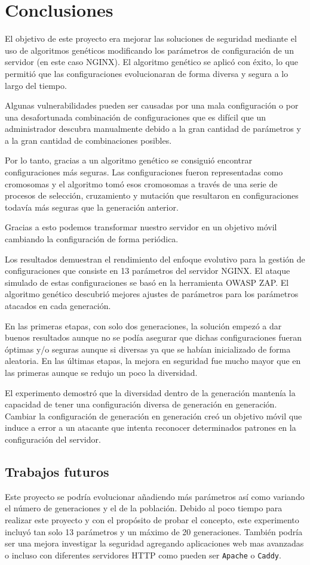 \chapter{Conclusiones}

El objetivo de este proyecto era mejorar las soluciones de seguridad mediante el uso de algoritmos genéticos modificando los parámetros de configuración de un servidor (en este caso NGINX). El algoritmo genético se aplicó con éxito, lo que permitió que las configuraciones evolucionaran de forma diversa y segura a lo largo del tiempo.

\bigskip
Algunas vulnerabilidades pueden ser causadas por una mala configuración o por una desafortunada combinación de configuraciones que es difícil que un administrador descubra manualmente debido a la gran cantidad de parámetros y a la gran cantidad de combinaciones posibles.

\bigskip
Por lo tanto, gracias a un algoritmo genético se consiguió encontrar configuraciones más seguras. Las configuraciones fueron representadas como cromosomas y el algoritmo tomó esos cromosomas a través de una serie de procesos de selección, cruzamiento y mutación que resultaron en configuraciones todavía más seguras que la generación anterior.

\bigskip
Gracias a esto podemos transformar nuestro servidor en un objetivo móvil cambiando la configuración de forma periódica.

\bigskip
Los resultados demuestran el rendimiento del enfoque evolutivo para la gestión de configuraciones que consiste en 13 parámetros del servidor NGINX. El ataque simulado de estas configuraciones se basó en la herramienta OWASP ZAP. El algoritmo genético descubrió mejores ajustes de parámetros para los parámetros atacados en cada generación.

\bigskip
En las primeras etapas, con solo dos generaciones, la solución empezó a dar buenos resultados aunque no se podía asegurar que dichas configuraciones fueran óptimas y/o seguras aunque si diversas ya que se habían inicializado de forma aleatoria. En las últimas etapas, la mejora en seguridad fue mucho mayor que en las primeras aunque se redujo un poco la diversidad.

\bigskip
El experimento demostró que la diversidad dentro de la generación mantenía la capacidad de tener una configuración diversa de generación en generación. Cambiar la configuración de generación en generación creó un objetivo móvil que induce a error a un atacante que intenta reconocer determinados patrones en la configuración del servidor.

\section{Trabajos futuros}
Este proyecto se podría evolucionar añadiendo más parámetros así como variando el número de generaciones y el de la población. Debido al poco tiempo para realizar este proyecto y con el propósito de probar el concepto, este experimento incluyó tan solo 13 parámetros y un máximo de 20 generaciones. También podría ser una mejora investigar la seguridad agregando aplicaciones web mas avanzadas o incluso con diferentes servidores HTTP como pueden ser  \texttt{Apache} o \texttt{Caddy}.
